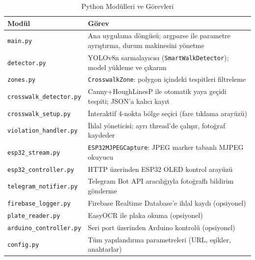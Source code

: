 \begin{table}[H]
\centering
\caption{Python Modülleri ve Görevleri}
\label{tbl:modüller}
\begin{tabular}{|l|p{9cm}|}
\hline
\textbf{Modül}                & \textbf{Görev} \\
\hline
\texttt{main.py}              & Ana uygulama döngüsü; argparse ile parametre ayrıştırma, durum makinesini yönetme \\
\hline
\texttt{detector.py}          & YOLOv8n sarmalayıcısı (\texttt{SmartWalkDetector}); model yükleme ve çıkarım \\
\hline
\texttt{zones.py}             & \texttt{CrosswalkZone}: polygon içindeki tespitleri filtreleme \\
\hline
\texttt{crosswalk\_detector.py} & Canny+HoughLinesP ile otomatik yaya geçidi tespiti; JSON'a kalıcı kayıt \\
\hline
\texttt{crosswalk\_setup.py}  & İnteraktif 4-nokta bölge seçici (fare tıklama arayüzü) \\
\hline
\texttt{violation\_handler.py}& İhlal yöneticisi; ayrı thread'de çalışır, fotoğraf kaydeder \\
\hline
\texttt{esp32\_stream.py}     & \texttt{ESP32MJPEGCapture}: JPEG marker tabanlı MJPEG okuyucu \\
\hline
\texttt{esp32\_controller.py} & HTTP üzerinden ESP32 OLED kontrol arayüzü \\
\hline
\texttt{telegram\_notifier.py}& Telegram Bot API aracılığıyla fotoğraflı bildirim gönderme \\
\hline
\texttt{firebase\_logger.py}  & Firebase Realtime Database'e ihlal kaydı (opsiyonel) \\
\hline
\texttt{plate\_reader.py}     & EasyOCR ile plaka okuma (opsiyonel) \\
\hline
\texttt{arduino\_controller.py}& Seri port üzerinden Arduino kontrolü (opsiyonel) \\
\hline
\texttt{config.py}            & Tüm yapılandırma parametreleri (URL, eşikler, anahtarlar) \\
\hline
\end{tabular}
\end{table}

